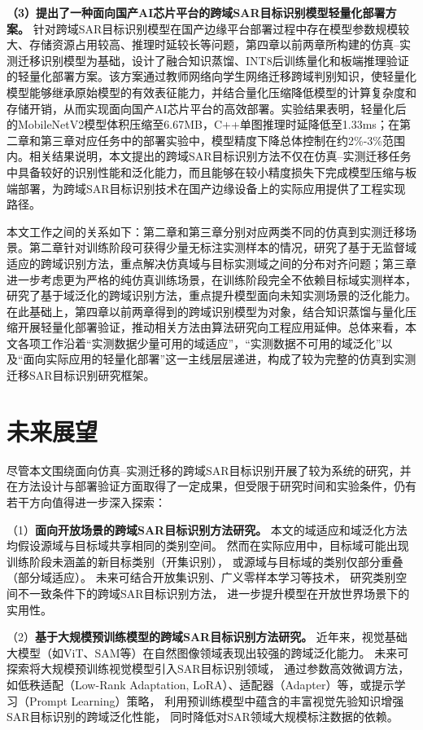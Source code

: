 \textbf{（3）提出了一种面向国产AI芯片平台的跨域SAR目标识别模型轻量化部署方案。}
针对跨域SAR目标识别模型在国产边缘平台部署过程中存在模型参数规模较大、存储资源占用较高、推理时延较长等问题，第四章以前两章所构建的仿真--实测迁移识别模型为基础，设计了融合知识蒸馏、INT8后训练量化和板端推理验证的轻量化部署方案。该方案通过教师网络向学生网络迁移跨域判别知识，使轻量化模型能够继承原始模型的有效表征能力，并结合量化压缩降低模型的计算复杂度和存储开销，从而实现面向国产AI芯片平台的高效部署。实验结果表明，轻量化后的MobileNetV2模型体积压缩至6.67MB，C++单图推理时延降低至1.33ms；在第二章和第三章对应任务中的部署实验中，模型精度下降总体控制在约2\%-3\%范围内。相关结果说明，本文提出的跨域SAR目标识别方法不仅在仿真--实测迁移任务中具备较好的识别性能和泛化能力，而且能够在较小精度损失下完成模型压缩与板端部署，为跨域SAR目标识别技术在国产边缘设备上的实际应用提供了工程实现路径。

本文工作之间的关系如下：第二章和第三章分别对应两类不同的仿真到实测迁移场景。第二章针对训练阶段可获得少量无标注实测样本的情况，研究了基于无监督域适应的跨域识别方法，重点解决仿真域与目标实测域之间的分布对齐问题；第三章进一步考虑更为严格的纯仿真训练场景，在训练阶段完全不依赖目标域实测样本，研究了基于域泛化的跨域识别方法，重点提升模型面向未知实测场景的泛化能力。在此基础上，第四章以前两章得到的跨域识别模型为对象，结合知识蒸馏与量化压缩开展轻量化部署验证，推动相关方法由算法研究向工程应用延伸。总体来看，本文各项工作沿着“实测数据少量可用的域适应”，“实测数据不可用的域泛化”以及“面向实际应用的轻量化部署”这一主线层层递进，构成了较为完整的仿真到实测迁移SAR目标识别研究框架。


\section{未来展望}

尽管本文围绕面向仿真--实测迁移的跨域SAR目标识别开展了较为系统的研究，并在方法设计与部署验证方面取得了一定成果，但受限于研究时间和实验条件，仍有若干方向值得进一步深入探索：

（1）\textbf{面向开放场景的跨域SAR目标识别方法研究。}
本文的域适应和域泛化方法均假设源域与目标域共享相同的类别空间。
然而在实际应用中，目标域可能出现训练阶段未涵盖的新目标类别（开集识别），
或源域与目标域的类别仅部分重叠（部分域适应）。
未来可结合开放集识别、广义零样本学习等技术，
研究类别空间不一致条件下的跨域SAR目标识别方法，
进一步提升模型在开放世界场景下的实用性。

（2）\textbf{基于大规模预训练模型的跨域SAR目标识别方法研究。}
近年来，视觉基础大模型（如ViT、SAM等）在自然图像领域表现出较强的跨域泛化能力。
未来可探索将大规模预训练视觉模型引入SAR目标识别领域，
通过参数高效微调方法，如低秩适配（Low-Rank Adaptation, LoRA）、适配器（Adapter）等，或提示学习（Prompt Learning）策略，
利用预训练模型中蕴含的丰富视觉先验知识增强SAR目标识别的跨域泛化性能，
同时降低对SAR领域大规模标注数据的依赖。

